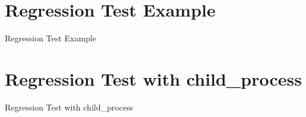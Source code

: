 \documentclass[handout, 14pt]{beamer}
\begin{document}
\def\title{Regression Test Example}
\section[regression]{\title}
\begin{frame}[fragile]{}%
\begin{center}%
%
%
\title
\end{center}%
\end{frame}
  

\def\title{Regression Test with child\_process}
\section[regression]{\title}
\begin{frame}[fragile]{}%
\begin{center}%
%
%
\title
\end{center}%
\end{frame}
   
\end{document}
